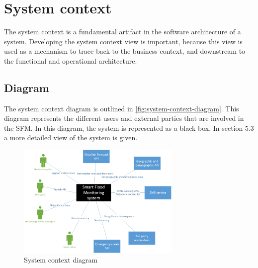 \section{System context}
The system context is a fundamental artifact in the software architecture of a system. Developing the system context view is important, because this view is used as a mechanism to trace back to the business context, and downstream to the functional and operational architecture.

\subsection{Diagram}
The system context diagram is outlined in \autoref{fig:system-context-diagram}. This diagram represents the different users and external parties that are involved in the SFM. In this diagram, the system is represented as a black box. In section 5.3 a more detailed view of the system is given. 

\begin{figure}[H]
\centering
\includegraphics[keepaspectratio=true,width=0.7\textwidth]{images/system_context.png}
\caption{System context diagram}
\label{fig:system-context-diagram}
\end{figure}

